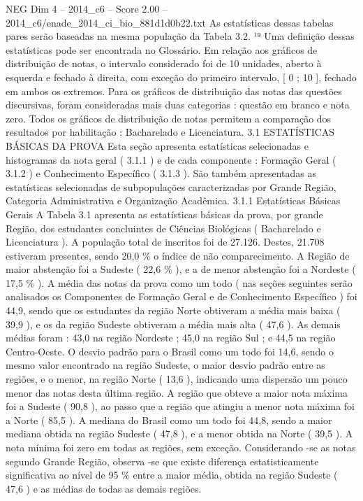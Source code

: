 \begin{textsample}{NEG Dim 4 – 2014\_c6 – Score 2.00 – 2014\_c6/enade\_2014\_ci\_bio\_881d1d0b22.txt}
As estatísticas dessas tabelas pares serão baseadas na mesma população da Tabela 3.2. ¹⁹ Uma definição dessas estatísticas pode ser encontrada no Glossário.
Em relação aos gráficos de distribuição de notas, o intervalo considerado foi de 10 unidades, aberto à esquerda e fechado à direita, com exceção do primeiro intervalo, [ 0 ; 10 ], fechado em ambos os extremos.
Para os gráficos de distribuição das notas das questões discursivas, foram consideradas mais duas categorias : questão em branco e nota zero.
Todos os gráficos de distribuição de notas permitem a comparação dos resultados por habilitação : Bacharelado e Licenciatura. 3.1 ESTATÍSTICAS BÁSICAS DA PROVA Esta seção apresenta estatísticas selecionadas e histogramas da nota geral ( 3.1.1 ) e de cada componente : Formação Geral ( 3.1.2 ) e Conhecimento Específico ( 3.1.3 ).
São também apresentadas as estatísticas selecionadas de subpopulações caracterizadas por Grande Região, Categoria Administrativa e Organização Acadêmica. 3.1.1 Estatísticas Básicas Gerais A Tabela 3.1 apresenta as estatísticas básicas da prova, por grande Região, dos estudantes concluintes de Ciências Biológicas ( Bacharelado e Licenciatura ).
A população total de inscritos foi de 27.126.
Destes, 21.708 estiveram presentes, sendo 20,0 \% o índice de não comparecimento.
A Região de maior abstenção foi a Sudeste ( 22,6 \% ), e a de menor abstenção foi a Nordeste ( 17,5 \% ).
A média das notas da prova como um todo ( nas seções seguintes serão analisados os Componentes de Formação Geral e de Conhecimento Específico ) foi 44,9, sendo que os estudantes da região Norte obtiveram a média mais baixa ( 39,9 ), e os da região Sudeste obtiveram a média mais alta ( 47,6 ).
As demais médias foram : 43,0 na região Nordeste ; 45,0 na região Sul ; e 44,5 na região Centro-Oeste.
O desvio padrão para o Brasil como um todo foi 14,6, sendo o mesmo valor encontrado na região Sudeste, o maior desvio padrão entre as regiões, e o menor, na região Norte ( 13,6 ), indicando uma dispersão um pouco menor das notas desta última região.
A região que obteve a maior nota máxima foi a Sudeste ( 90,8 ), ao passo que a região que atingiu a menor nota máxima foi a Norte ( 85,5 ).
A mediana do Brasil como um todo foi 44,8, sendo a maior mediana obtida na região Sudeste ( 47,8 ), e a menor obtida na Norte ( 39,5 ).
A nota mínima foi zero em todas as regiões, sem exceção.
Considerando -se as notas segundo Grande Região, observa -se que existe diferença estatisticamente significativa ao nível de 95 \% entre a maior média, obtida na região Sudeste ( 47,6 ) e as médias de todas as demais regiões.

\end{textsample}

